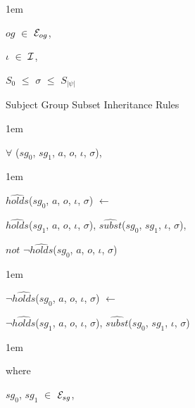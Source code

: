 \documentclass[11pt]{report}
\newenvironment{vquote}
{
  \begin{list}{}{\leftmargin 1em}\item[]
}
{
  \end{list}
}
\begin{document}
\begin{enumerate}
\begin{vquote}
                    \hspace{1em}
                    $og$ $\in$ ${\cal E}_{og}$,

                    \hspace{1em}
                    $\iota$ $\in$ ${\cal I}$,

                    \hspace{1em}
                    $S_{0}$ $\leq$ $\sigma$ $\leq$ $S_{|\psi|}$
                  \end{vquote}

                \item
                  Subject Group Subset Inheritance Rules

                  \begin{vquote}
                    $\forall$ ($sg_0$, $sg_1$, $a$, $o$, $\iota$, $\sigma$),
                  \end{vquote}

                  \begin{vquote}
                    $\hat{holds}$($sg_0$, $a$, $o$, $\iota$, $\sigma$)
                    $\leftarrow$

                    \hspace{1em}
                    $\hat{holds}$($sg_1$, $a$, $o$, $\iota$, $\sigma$),
                    $\hat{subst}$($sg_0$, $sg_1$, $\iota$, $\sigma$),

                    \hspace{1em}
                    $not$ $\lnot\hat{holds}$($sg_0$, $a$, $o$, $\iota$, $\sigma$)
                  \end{vquote}

                  \begin{vquote}
                    $\lnot\hat{holds}$($sg_0$, $a$, $o$, $\iota$, $\sigma$)
                    $\leftarrow$

                    \hspace{1em}
                    $\lnot\hat{holds}$($sg_1$, $a$, $o$, $\iota$, $\sigma$),
                    $\hat{subst}$($sg_0$, $sg_1$, $\iota$, $\sigma$)
                  \end{vquote}

                  \begin{vquote}
                    where

                    \hspace{1em}
                    $sg_0$, $sg_1$ $\in$ ${\cal E}_{sg}$,


\end{vquote}
\end{enumerate}
\end{document}
